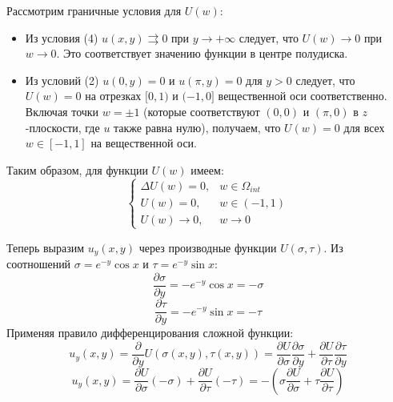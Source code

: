 \documentclass[12pt, a4paper]{article}
\begin{document}
Рассмотрим граничные условия для $U(w)$:
\begin{itemize}
	\item Из условия (4) $u(x,y) \rightrightarrows 0$ при $y \to +\infty$ следует, что $U(w) \to 0$ при $w \to 0$. Это соответствует значению функции в центре полудиска.
	\item Из условий (2) $u(0,y) = 0$ и $u(\pi,y) = 0$ для $y>0$ следует, что $U(w)=0$ на отрезках $[0,1)$ и $(-1,0]$ вещественной оси соответственно. Включая точки $w=\pm 1$ (которые соответствуют $(0,0)$ и $(\pi,0)$ в $z$-плоскости, где $u$ также равна нулю), получаем, что $U(w) = 0$ для всех $w \in [-1,1]$ на вещественной оси.
\end{itemize}
Таким образом, для функции $U(w)$ имеем:
\begin{equation*}
	\begin{cases}
		\Delta U(w) = 0, & w \in \Omega_{int} \\
		U(w) = 0, & w \in (-1, 1) \\
		U(w) \to 0, & w \to 0
	\end{cases}
\end{equation*}

Теперь выразим $u_y(x,y)$ через производные функции $U(\sigma, \tau)$. Из соотношений $\sigma = e^{-y}\cos x$ и $\tau = e^{-y}\sin x$:
$$\frac{\partial \sigma}{\partial y} = -e^{-y}\cos x = -\sigma$$
$$\frac{\partial \tau}{\partial y} = -e^{-y}\sin x = -\tau$$
Применяя правило дифференцирования сложной функции:
$$u_y(x,y) = \frac{\partial}{\partial y} U(\sigma(x,y), \tau(x,y)) = \frac{\partial U}{\partial \sigma} \frac{\partial \sigma}{\partial y} + \frac{\partial U}{\partial \tau} \frac{\partial \tau}{\partial y}$$
$$u_y(x,y) = \frac{\partial U}{\partial \sigma} (-\sigma) + \frac{\partial U}{\partial \tau} (-\tau) = - \left( \sigma \frac{\partial U}{\partial \sigma} + \tau \frac{\partial U}{\partial \tau} \right)$$
\end{document}
